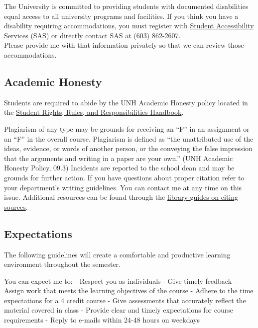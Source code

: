 \documentclass[
  letterpaper,
  DIV=11,
  numbers=noendperiod]{scrreprt}
\begin{document}
The University is committed to providing students with documented
disabilities equal access to all university programs and facilities. If
you think you have a disability requiring accommodations, you must
register with \href{http://www.unh.edu/studentaccessibility}{Student
Accessibility Services (SAS)} or directly contact SAS at (603)
862-2607.\\
Please provide me with that information privately so that we can review
those accommodations.

\hypertarget{academic-honesty}{%
\subsection*{Academic Honesty}\label{academic-honesty}}

Students are required to abide by the UNH Academic Honesty policy
located in the \href{https://catalog.unh.edu/srrr/}{Student Rights,
Rules, and Responsibilities Handbook}.

Plagiarism of any type may be grounds for receiving an ``F'' in an
assignment or an ``F'' in the overall course. Plagiarism is defined as
``the unattributed use of the ideas, evidence, or words of another
person, or the conveying the false impression that the arguments and
writing in a paper are your own.'' (UNH Academic Honesty Policy, 09.3)
Incidents are reported to the school dean and may be grounds for further
action. If you have questions about proper citation refer to your
department's writing guidelines. You can contact me at any time on this
issue. Additional resources can be found through the
\href{http://libraryguides.unh.edu/unhmcitingsources}{library guides on
citing sources}.

\hypertarget{expectations}{%
\subsection*{Expectations}\label{expectations}}

The following guidelines will create a comfortable and productive
learning environment throughout the semester.

You can expect me to: - Respect you as individuals - Give timely
feedback - Assign work that meets the learning objectives of the course
- Adhere to the time expectations for a 4 credit course - Give
assessments that accurately reflect the material covered in class -
Provide clear and timely expectations for course requirements - Reply to
e-mails within 24-48 hours on weekdays
\end{document}
